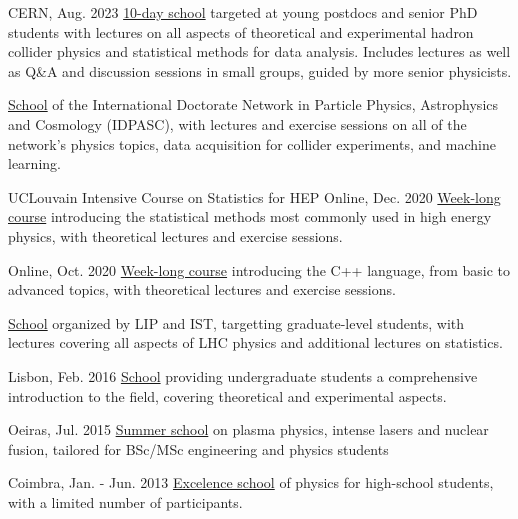 
\begin{cventries}
    {}{CERN, Aug. 2023}
    {\href{https://indico.cern.ch/event/1234112/}{10-day school} targeted at young postdocs and senior PhD students with lectures on all aspects of theoretical and experimental hadron collider physics and statistical methods for data analysis. Includes lectures as well as Q\&A and discussion sessions in small groups, guided by more senior physicists.}\vspace*{2mm}

    {\href{https://indico.lip.pt/event/643}{School} of the International Doctorate Network in Particle Physics, Astrophysics and Cosmology (IDPASC), with lectures and exercise sessions on all of the network's physics topics, data acquisition for collider experiments, and machine learning.}\vspace*{2mm}
    
    \cventry
    {{UCLouvain Intensive Course on Statistics for HEP}}{}
    {}{Online, Dec. 2020}
    {\href{https://agenda.irmp.ucl.ac.be/event/4097/}{Week-long course} introducing the statistical methods most commonly used in high energy physics, with theoretical lectures and exercise sessions.}\vspace*{2mm}
    
    {}{Online, Oct. 2020}
    {\href{https://indico.cern.ch/event/946584}{Week-long course} introducing the C++ language, from basic to advanced topics, with theoretical lectures and exercise sessions.}\vspace*{2mm}
        
    {\href{https://indico.cern.ch/event/997566/}{School} organized by LIP and IST, targetting graduate-level students, with lectures covering all aspects of LHC physics and additional lectures on statistics.}

    {}{Lisbon, Feb. 2016}
    {\href{https://indico.lip.pt/event/206/}{School} providing undergraduate students a comprehensive introduction to the field, covering theoretical and experimental aspects.}\vspace*{2mm}

    {}{Oeiras, Jul. 2015}
    {\href{http://plasmasurf.tecnico.ulisboa.pt/index.html}{Summer school} on plasma physics, intense lasers and nuclear fusion, tailored for BSc/MSc engineering and physics students}

    {}{Coimbra, Jan. - Jun. 2013}
    {\href{https://quark.fis.uc.pt}{Excelence school} of physics for high-school students, with a limited number of participants.}

\end{cventries}

